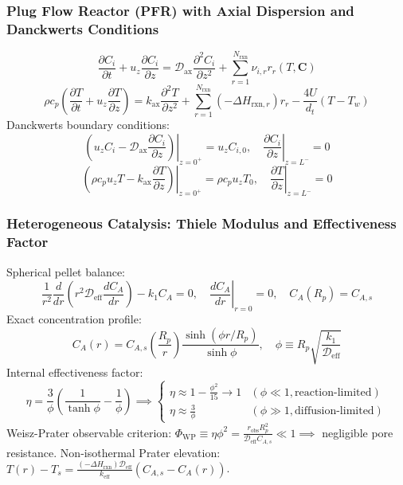 \documentclass[11pt,a4paper]{article}
\begin{document}
\subsubsection{Plug Flow Reactor (PFR) with Axial Dispersion and Danckwerts Conditions}
\begin{equation}
\frac{\partial C_i}{\partial t} + u_z \frac{\partial C_i}{\partial z} = \mathcal{D}_{\text{ax}} \frac{\partial^2 C_i}{\partial z^2} + \sum_{r=1}^{N_{\text{rxn}}} \nu_{i,r} r_r(T, \mathbf{C})
\end{equation}
\begin{equation}
\rho c_p \left( \frac{\partial T}{\partial t} + u_z \frac{\partial T}{\partial z} \right) = k_{\text{ax}} \frac{\partial^2 T}{\partial z^2} + \sum_{r=1}^{N_{\text{rxn}}} (-\Delta H_{\text{rxn},r}) r_r - \frac{4 U}{d_t} (T - T_w)
\end{equation}
Danckwerts boundary conditions:
\begin{equation}
\left. \left( u_z C_i - \mathcal{D}_{\text{ax}} \frac{\partial C_i}{\partial z} \right) \right|_{z=0^+} = u_z C_{i,0}, \quad \left. \frac{\partial C_i}{\partial z} \right|_{z=L^-} = 0
\end{equation}
\begin{equation}
\left. \left( \rho c_p u_z T - k_{\text{ax}} \frac{\partial T}{\partial z} \right) \right|_{z=0^+} = \rho c_p u_z T_0, \quad \left. \frac{\partial T}{\partial z} \right|_{z=L^-} = 0
\end{equation}

\subsubsection{Heterogeneous Catalysis: Thiele Modulus and Effectiveness Factor}
Spherical pellet balance:
\begin{equation}
\frac{1}{r^2} \frac{d}{dr}\left( r^2 \mathcal{D}_{\text{eff}} \frac{d C_A}{dr} \right) - k_1 C_A = 0, \quad \left. \frac{d C_A}{dr} \right|_{r=0} = 0, \quad C_A(R_p) = C_{A,s}
\end{equation}
Exact concentration profile:
\begin{equation}
C_A(r) = C_{A,s} \left( \frac{R_p}{r} \right) \frac{\sinh(\phi r / R_p)}{\sinh \phi}, \quad \phi \equiv R_p \sqrt{\frac{k_1}{\mathcal{D}_{\text{eff}}}}
\end{equation}
Internal effectiveness factor:
\begin{equation}
\eta = \frac{3}{\phi} \left( \frac{1}{\tanh \phi} - \frac{1}{\phi} \right) \implies \begin{cases} \eta \approx 1 - \frac{\phi^2}{15} \to 1 & (\phi \ll 1, \text{reaction-limited}) \\ \eta \approx \frac{3}{\phi} & (\phi \gg 1, \text{diffusion-limited}) \end{cases}
\end{equation}
Weisz-Prater observable criterion: $\Phi_{\text{WP}} \equiv \eta \phi^2 = \frac{r_{\text{obs}} R_p^2}{\mathcal{D}_{\text{eff}} C_{A,s}} \ll 1 \implies$ negligible pore resistance. Non-isothermal Prater elevation: $T(r) - T_s = \frac{(-\Delta H_{\text{rxn}}) \mathcal{D}_{\text{eff}}}{k_{\text{eff}}} (C_{A,s} - C_A(r))$.
\end{document}
